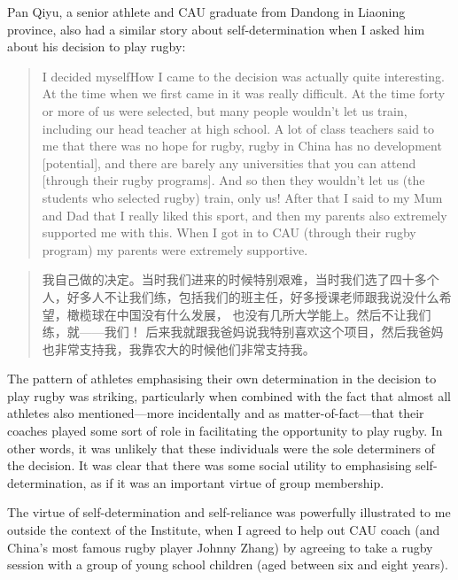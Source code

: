 \begin{CJK}{UTF8}{gbsn}
  Pan Qiyu, a senior athlete and CAU graduate from Dandong in Liaoning province, also had a similar story about self-determination when I asked him about his decision to play rugby:
     \begin{quote}
       I decided myself\textellipsis How I came to the decision was actually quite interesting.  At the time when we first came in it was really difficult.  At the time forty or more of us were selected, but many people wouldn't let us train, including our head teacher at high school.  A lot of class teachers said to me that there was no hope for rugby, rugby in China has no development [potential], and there are barely any universities that you can attend [through their rugby programs].  And so then they wouldn't let us (the students who selected rugby) train, only us! After that I said to my Mum and Dad that I really liked this sport, and then my parents also extremely supported me with this.  When I got in to CAU (through their rugby program) my parents were extremely supportive.
    \end{quote}

     \begin{quote}
       我自己做的决定。当时我们进来的时候特别艰难，当时我们选了四十多个人，好多人不让我们练，包括我们的班主任，好多授课老师跟我说没什么希望，橄榄球在中国没有什么发展， 也没有几所大学能上。然后不让我们练，就——我们！ 后来我就跟我爸妈说我特别喜欢这个项目，然后我爸妈也非常支持我，我靠农大的时候他们非常支持我。
     \end{quote}

The pattern of athletes emphasising their own determination in the decision to play rugby was striking, particularly when combined with the fact that almost all athletes also mentioned---more incidentally and as matter-of-fact---that their coaches played some sort of role in facilitating the opportunity to play rugby.  In other words, it was unlikely that these individuals were the sole determiners of the decision.  It was clear that there was some social utility to emphasising self-determination, as if it was an important virtue of group membership.

The virtue of self-determination and self-reliance was powerfully illustrated to me outside the context of the Institute, when I agreed to help out CAU coach (and China's most famous rugby player Johnny Zhang) by agreeing to take a rugby session with a group of young school children (aged between six and eight years).


\end{CJK}
